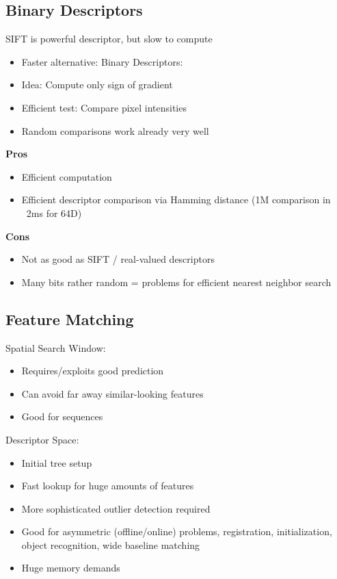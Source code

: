 \subsection{Binary Descriptors}

SIFT is powerful descriptor, but slow to compute
\begin{itemize}
\item Faster alternative: Binary Descriptors:
\item Idea: Compute only sign of gradient
\item Efficient test: Compare pixel intensities
\item Random comparisons work already very well
\end{itemize}

\textbf{Pros}
\begin{itemize}
\item Efficient computation
\item Efficient descriptor comparison via Hamming distance (1M comparison in ~2ms for 64D)
\end{itemize}

\textbf{Cons}
\begin{itemize}
\item Not as good as SIFT / real-valued descriptors
\item Many bits rather random = problems for efficient nearest neighbor search
\end{itemize}


\subsection{Feature Matching}

Spatial Search Window:
\begin{itemize}
\item Requires/exploits good prediction
\item Can avoid far away similar-looking features
\item Good for sequences
\end{itemize}

Descriptor Space:
\begin{itemize}
\item Initial tree setup
\item Fast lookup for huge amounts of features
\item More sophisticated outlier detection required
\item Good for asymmetric (offline/online) problems, registration, initialization, object recognition, wide baseline matching
\item Huge memory demands
\end{itemize}



